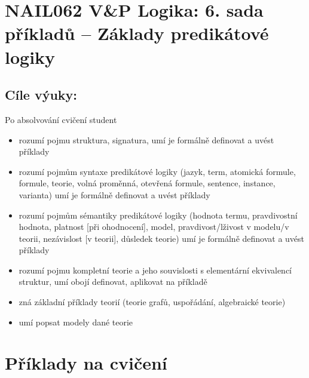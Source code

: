 \section*{NAIL062 V\&P Logika: 6. sada příkladů -- Základy predikátové logiky}


\subsection*{Cíle výuky:} Po absolvování cvičení student

\begin{itemize}\setlength{\itemsep}{0pt}
    \item rozumí pojmu struktura, signatura, umí je formálně definovat a uvést příklady
    \item rozumí pojmům syntaxe predikátové logiky (jazyk, term, atomická formule, formule, teorie, volná proměnná, otevřená formule, sentence, instance, varianta) umí je formálně definovat a uvést příklady
    \item rozumí pojmům sémantiky predikátové logiky (hodnota termu, pravdivostní hodnota, platnost [při ohodnocení], model, pravdivost/lživost v modelu/v teorii, nezávislost [v teorii], důsledek teorie) umí je formálně definovat a uvést příklady
    \item rozumí pojmu kompletní teorie a jeho souvislosti s elementární ekvivalencí struktur, umí obojí definovat, aplikovat na příkladě
    \item zná základní příklady teorií (teorie grafů, uspořádání, algebraické teorie)
    \item umí popsat modely dané teorie    
\end{itemize}
    

\section*{Příklady na cvičení}


